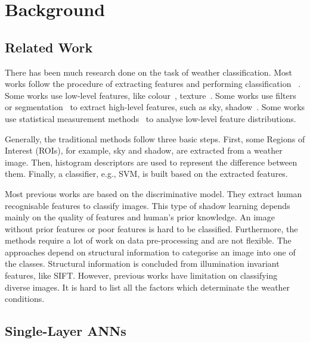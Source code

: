 
\chapter{Background} %
\label{Chapter2}

\section{Related Work}

There has been much research done on the task of weather classification. Most works follow the procedure of extracting features and performing classification ~\citep{bishop1995neural,roser2008classification,serrano2002computationally,gokalp2007scene}.
Some works use low-level features, like colour~\citep{szummer1998indoor}, texture~\citep{shotton2009textonboost,vailaya2002automatic}. Some works use filters or segmentation~\citep{boutell2004learning,shotton2009textonboost} to extract high-level features, such as sky, shadow~\citep{lutwo}. Some works use statistical measurement methods~\citep{he2014spatial,roser2008classification} to analyse low-level feature distributions.

Generally, the traditional methods follow three basic steps\citep{roser2008classification,yan2009weather}. First, some Regions of Interest (ROIs), for example, sky and shadow,  are extracted from a weather image. Then, histogram descriptors are used to represent the difference between them. Finally, a classifier, e.g., SVM, is built based on the extracted features. 

Most previous works are based on the discriminative model. They extract human recognisable features to classify images. This type of shadow learning depends mainly on the quality of features and human's prior knowledge. An image without prior features or poor features is hard to be classified. Furthermore, the methods require a lot of work on data pre-processing and are not flexible. The approaches depend on structural information to categorise an image into one of the classes. Structural information is concluded from illumination invariant features, like SIFT. However, previous works have limitation on classifying diverse images. It is hard to list all the factors which determinate the weather conditions.

\section{Single-Layer ANNs}

